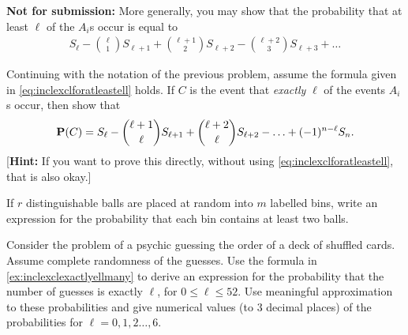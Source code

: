 \documentclass[preprint,  11pt]{amsart}
\begin{document}
\medskip
{}

{\bf Not for submission:} More generally, you may show that the probability that at least $\ell$ of the $A_{i}$s occur is equal to
\begin{align}\label{eq:inclexclforatleastell}
S_{\ell}-\binom{\ell}{1}S_{\ell+1}+\binom{\ell+1}{2}S_{\ell+2}-\binom{\ell+2}{3}S_{\ell+3}+\ldots
\end{align}
\eepr

\bigskip
\bepr Continuing with the notation of the previous problem, assume the formula given in \eqref{eq:inclexclforatleastell} holds. If $C$ is the event that {\em exactly} $\ell$ of the events $A_{i}$s occur, then show that
\begin{align}\label{ex:inclexclexactlyellmany}
\P(C)=S_{\ell}-\binom{\ell+1}{\ell}S_{\ell+1}+\binom{\ell+2}{\ell}S_{\ell+2}-\ldots +(-1)^{n-\ell}S_{n}.
\end{align}
[{\bf Hint:} If you want to prove this directly, without using \eqref{eq:inclexclforatleastell}, that is also okay.]
\eepr


\bigskip
\bepr If $r$ distinguishable balls are placed at random into $m$ labelled bins, write an expression for the probability that each  bin contains at least two balls.
\eepr

\bigskip
{}
\eepr

\bigskip
{}
\eepr

\bigskip
\bepr Consider the problem of a psychic guessing the order of a deck of shuffled cards. Assume complete randomness of the guesses. Use the formula in \eqref{ex:inclexclexactlyellmany} to derive an expression for the probability that the number of guesses is exactly $\ell$, for $0\le \ell\le 52$. Use meaningful approximation to these probabilities and give numerical values (to 3 decimal places) of the probabilities for $\ell=0,1,2\ldots ,6$.
\eepr
\end{document}
